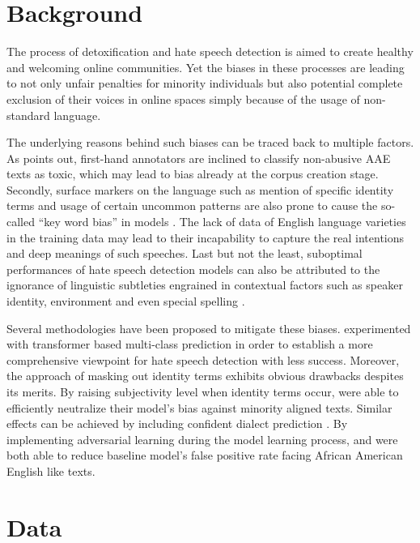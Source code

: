 \documentclass[11pt]{article}
\begin{document}
\section{Background}

The process of detoxification and hate speech detection is aimed to create healthy and welcoming online communities. Yet the biases in these processes are leading to not only unfair penalties for minority individuals \citep{davidson-etal-2019-racial} but also potential complete exclusion of their voices in online spaces \citep{blodgett-2017-racial} simply because of the usage of non-standard language.

The underlying reasons behind such biases can be traced back to multiple factors. As \citet{xia-etal-2020-demoting} points out, first-hand annotators are inclined to classify non-abusive AAE texts as toxic, which may lead to bias already at the corpus creation stage. Secondly, surface markers on the language such as mention of specific identity terms and usage of certain uncommon patterns are also prone to cause the so-called \enquote{key word bias} in models \citep{resende-2024-comprehensive, schafer-2023-bias}. The lack of data of English language varieties in the training data may lead to their incapability to capture the real intentions and deep meanings of such speeches. Last but not the least, suboptimal performances of hate speech detection models can also be attributed to the ignorance of linguistic subtleties engrained in contextual factors such as speaker identity, environment and even special spelling \citep{davidson-etal-2019-racial}.

Several methodologies have been proposed to mitigate these biases. \citet{schafer-2023-bias} experimented with transformer based multi-class prediction in order to establish a more comprehensive viewpoint for hate speech detection with less success. Moreover, the approach of masking out identity terms exhibits obvious drawbacks despites its merits. By raising subjectivity level when identity terms occur, \citep{zhao-2022-subjectivity} were able to efficiently neutralize their model’s bias against minority aligned texts. Similar effects can be achieved by including confident dialect prediction \citep{ball-2021-differential}. By implementing adversarial learning during the model learning process, \citet{xia-etal-2020-demoting} and \citep{okpala-2022-aaebert} were both able to reduce baseline model’s false positive rate facing African American English like texts.


\section{Data}
\end{document}
